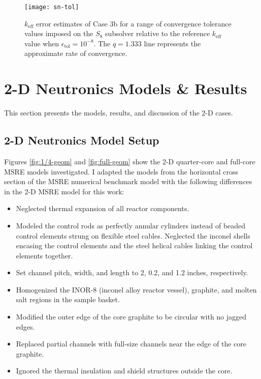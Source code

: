 \begin{figure}[htb!]
  \centering
  \texttt{[image: sn-tol]}
  \caption{$k_\text{eff}$ error estimates of Case 3b for a range of convergence tolerance values
  imposed on the $S_8$ subsolver relative to the reference $k_\text{eff}$ value when
  $\epsilon_\text{tol}=10^{-8}$. The $q=1.333$ line represents the approximate rate of
  convergence.}
  \label{fig:sn-tol}
\end{figure}

\section{2-D Neutronics Models \& Results} \label{sec:2d-results}

This section presents the models, results, and discussion of the 2-D cases.

\subsection{2-D Neutronics Model Setup} \label{sec:2d-model-setup}

Figures \ref{fig:1/4-geom} and \ref{fig:full-geom} show the 2-D quarter-core and full-core
\gls{MSRE} models investigated. I adapted the models from the horizontal cross section of the
\gls{MSRE} numerical benchmark model \cite{fratoni_molten_2020} with the
following differences in the 2-D \gls{MSRE} model for this work:

\begin{itemize}
  \item Neglected thermal expansion of all reactor components.
  \item Modeled the control rods as perfectly annular cylinders instead of beaded control elements
    strung on flexible steel cables. Neglected the inconel shells encasing the control elements and
    the steel helical cables linking the control elements together.
  \item Set channel pitch, width, and length to 2, 0.2, and 1.2 inches, respectively.
  \item Homogenized the INOR-8 (inconel alloy reactor vessel), graphite, and molten salt regions in the sample basket.
  \item Modified the outer edge of the core graphite to be circular with no jagged edges.
  \item Replaced partial channels with full-size channels near the edge of the core graphite.
  \item Ignored the thermal insulation and shield structures outside the core.
\end{itemize}

